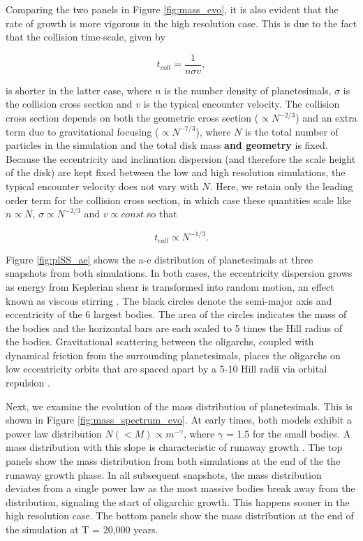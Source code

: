 Comparing the two panels in Figure \ref{fig:mass_evo}, it is also evident that the rate of growth is more vigorous in the high 
resolution case. This is due to the fact that the collision time-scale, given by 

\begin{equation}\label{eq:coll_timescale}
t_{coll} = \frac{1}{n \sigma v},
\end{equation}

\noindent is shorter in the latter case, where $n$ is the number density of planetesimals, $\sigma$ is the collision cross section 
and $v$ is the typical encounter velocity. The collision cross section depends on both the geometric cross section ($\propto 
N^{-2/3}$) and an extra term due to gravitational focusing ($\propto N^{-7/3}$), where $N$ is the total number of particles in the 
simulation and the total disk mass \textbf{and geometry} is fixed. Because the eccentricity and inclination dispersion (and therefore the scale height of 
the disk) are kept fixed between the low and high resolution simulations, the typical encounter velocity does not vary with $N$. 
Here, we retain only the leading order term for the collision cross section, in which case these quantities scale like $n \propto N$, 
$\sigma \propto N^{-2/3}$ and $v \propto const$ so that

\begin{equation}\label{eq:coll_timescale_N}
t_{coll} \propto N^{-1/3}.
\end{equation}

Figure \ref{fig:plSS_ae} shows the a-e distribution of planetesimals at three snapshots from both simulations. In both cases, the 
eccentricity dispersion grows as energy from Keplerian shear is transformed into random motion, an effect known as viscous 
stirring \cite{ohtsuki02}. The black circles denote the semi-major axis and eccentricity of the 6 largest bodies. The area of the 
circles indicates the mass of the bodies and the horizontal bars are each scaled to 5 times the Hill radius of the bodies. 
Gravitational scattering between the oligarchs, coupled with dynamical friction from the surrounding planetesimals, places the 
oligarchs on low eccentricity orbits that are spaced apart by a 5-10 Hill radii via orbital repulsion \cite{kokubo98}.

Next, we examine the evolution of the mass distribution of planetesimals. This is shown in Figure \ref{fig:mass_spectrum_evo}. At 
early times, both models exhibit a power law distribution $N(<M) \propto m^{-\gamma}$, where $\gamma$ = 1.5 for the small bodies. A mass 
distribution with this slope is characteristic of runaway growth \cite{wetherill93}. The top panels show the mass distribution from 
both simulations at the end of the the runaway growth phase. In all subsequent snapshots, the mass distribution deviates from a 
single power law as the most massive bodies break away from the distribution, signaling the start of oligarchic growth. This 
happens sooner in the high resolution case. The bottom panels show the mass distribution at the end of the simulation at T = 
20,000 years.

